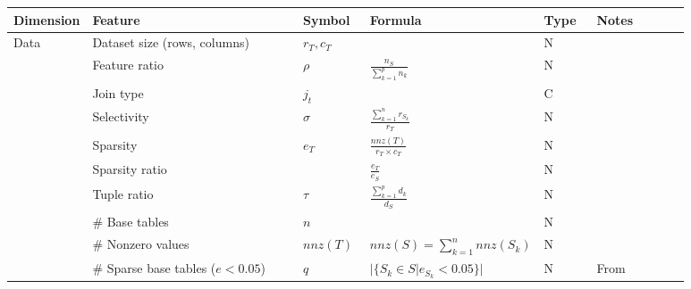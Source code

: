 \begin{tabular}{lp{0.35\linewidth}p{0.10\linewidth}>{\footnotesize}p{0.2\linewidth}p{0.08\linewidth}p{0.15\linewidth}}
  \toprule
  Dimension                              & Feature                                 & Symbol                            & Formula                                 & Type & Notes                                \\
  \midrule\midrule
  \multirow[t]{10}{*}{Data}              & Dataset size (rows, columns)            & $r_T, c_T$                        &                                         & N    &                                      \\
                                         & Feature ratio                           & $\rho$                            & $\frac{n_S}{\sum_{k=1}^p n_k} $         & N    &                                      \\
                                         & Join type                               & $j_t$                             &                                         & C    &                                      \\
                                         & Selectivity                             & $\sigma$                          & $\frac{\sum_{k=1}^{n}r_{S_k}}{r_T}$     & N    &                                      \\
                                         & Sparsity                                & $e_T$                             & $\frac{nnz(T)}{r_T\times c_T}$          & N    &                                      \\
                                         & Sparsity ratio                          &                                   & $\frac{e_T}{e_S}$                       & N    &                                      \\
                                         & Tuple ratio                             & $\tau$                            & $\frac{\sum_{k=1}^p d_k}{d_S}$          & N    &                                      \\
                                         & \# Base tables                          & $n$                               &                                         & N    &                                      \\
                                         & \# Nonzero values                       & $nnz(T)$                          & $nnz(S) = \sum_{k=1}^{n}nnz(S_k)$       & N    &                                      \\
                                         & \# Sparse base tables ($e < 0.05$)      & $q$                               & $|\{S_k \in S| e_{S_k} < 0.05\}|$       & N    & From~\cite{MorpheusFI}               \\


\end{tabular}
